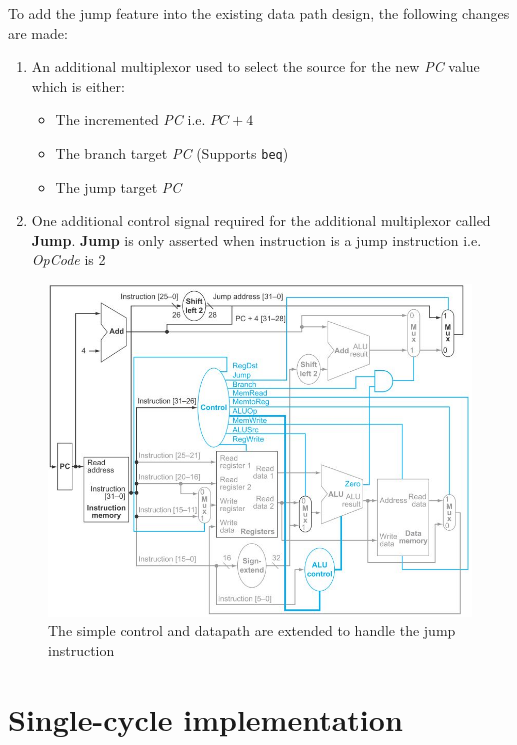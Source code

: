 \documentclass[10pt,a4paper]{article}
\begin{document}
To add the jump feature into the existing data path design, the following changes are made:
\begin{enumerate}
    \item An additional multiplexor used to select the source for the new \textit{PC} value which 
    is either:
    \begin{itemize}
        \item The incremented \textit{PC} i.e. $PC+4$
        \item The branch target \textit{PC} (Supports \texttt{beq})
        \item The jump target \textit{PC}
    \end{itemize} 
    \item One additional control signal required for the additional multiplexor called
    \textbf{Jump}. \textbf{Jump} is only asserted when instruction is a jump instruction i.e.
    \textit{OpCode} is 2
\end{enumerate}

\pagebreak
\begin{figure} [h!]
    \centering
    \includegraphics[scale=0.75]{Jump data path.JPG}
    \caption{The simple control and datapath are extended to handle the jump instruction}
\end{figure}

\pagebreak

\section{Single-cycle implementation}
\end{document}
